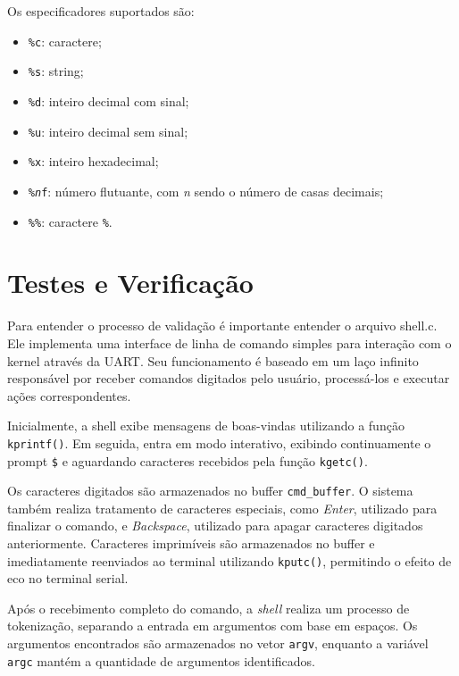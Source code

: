 \begin{itemize}
    Os especificadores suportados são:
    \begin{itemize}
        \item \texttt{\%c}: caractere;
        \item \texttt{\%s}: string;
        \item \texttt{\%d}: inteiro decimal com sinal;
        \item \texttt{\%u}: inteiro decimal sem sinal;
        \item \texttt{\%x}: inteiro hexadecimal;
        \item \texttt{\%\textit{n}f}: número flutuante, com \textit{n} sendo o número de casas decimais;
        \item \texttt{\%\%}: caractere \texttt{\%}.
    \end{itemize}


\end{itemize}


\section{Testes e Verificação}


Para entender o processo de validação é importante entender o arquivo shell.c. Ele implementa uma interface de linha de comando simples para interação com o kernel através da UART. Seu funcionamento é baseado em um laço infinito responsável por receber comandos digitados pelo usuário, processá-los e executar ações correspondentes.

Inicialmente, a shell exibe mensagens de boas-vindas utilizando a função \texttt{kprintf()}. Em seguida, entra em modo interativo, exibindo continuamente o prompt \texttt{\$} e aguardando caracteres recebidos pela função \texttt{kgetc()}.

Os caracteres digitados são armazenados no buffer \texttt{cmd\_buffer}. O sistema também realiza tratamento de caracteres especiais, como \textit{Enter}, utilizado para finalizar o comando, e \textit{Backspace}, utilizado para apagar caracteres digitados anteriormente. Caracteres imprimíveis são armazenados no buffer e imediatamente reenviados ao terminal utilizando \texttt{kputc()}, permitindo o efeito de eco no terminal serial.

Após o recebimento completo do comando, a \textit{shell} realiza um processo de tokenização, separando a entrada em argumentos com base em espaços. Os argumentos encontrados são armazenados no vetor \texttt{argv}, enquanto a variável \texttt{argc} mantém a quantidade de argumentos identificados.

